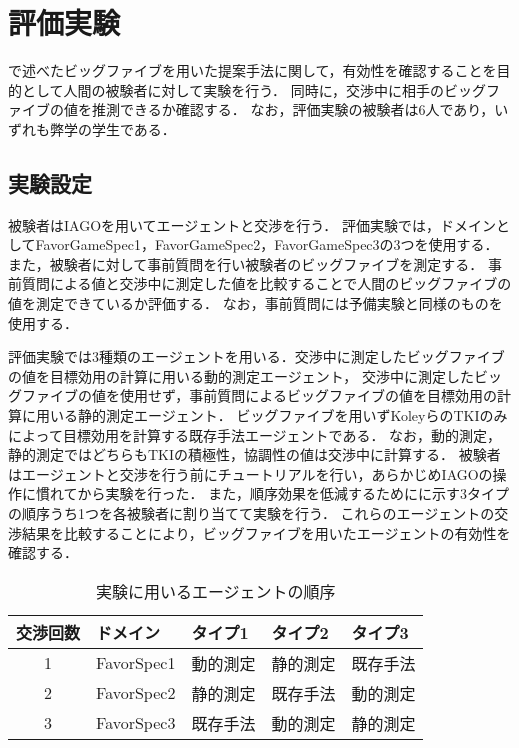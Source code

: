 

\chapter{評価実験}
で述べたビッグファイブを用いた提案手法に関して，有効性を確認することを目的として人間の被験者に対して実験を行う．
同時に，交渉中に相手のビッグファイブの値を推測できるか確認する．
なお，評価実験の被験者は6人であり，いずれも弊学の学生である．

\section{実験設定}
被験者はIAGOを用いてエージェントと交渉を行う．
評価実験では，ドメインとしてFavorGameSpec1，FavorGameSpec2，FavorGameSpec3の3つを使用する．
また，被験者に対して事前質問を行い被験者のビッグファイブを測定する．
事前質問による値と交渉中に測定した値を比較することで人間のビッグファイブの値を測定できているか評価する．
なお，事前質問には予備実験と同様のものを使用する．

評価実験では3種類のエージェントを用いる．交渉中に測定したビッグファイブの値を目標効用の計算に用いる動的測定エージェント，
交渉中に測定したビッグファイブの値を使用せず，事前質問によるビッグファイブの値を目標効用の計算に用いる静的測定エージェント．
ビッグファイブを用いずKoleyらのTKIのみによって目標効用を計算する既存手法エージェントである．
なお，動的測定，静的測定ではどちらもTKIの積極性，協調性の値は交渉中に計算する．
被験者はエージェントと交渉を行う前にチュートリアルを行い，あらかじめIAGOの操作に慣れてから実験を行った．
また，順序効果を低減するためにに示す3タイプの順序うち1つを各被験者に割り当てて実験を行う．
これらのエージェントの交渉結果を比較することにより，ビッグファイブを用いたエージェントの有効性を確認する．

\begin{table}[tb]
    \centering
    \caption{実験に用いるエージェントの順序}
    \begin{tabular}{cllll} \toprule
        交渉回数 & ドメイン & タイプ1 & タイプ2 & タイプ3 \\ \midrule
        1 & FavorSpec1 & 動的測定 & 静的測定 & 既存手法 \\
        2 & FavorSpec2 & 静的測定 & 既存手法 & 動的測定 \\
        3 & FavorSpec3 & 既存手法 & 動的測定 & 静的測定 \\ \bottomrule
    \end{tabular}
    \label{tab:exp-order}
\end{table}


